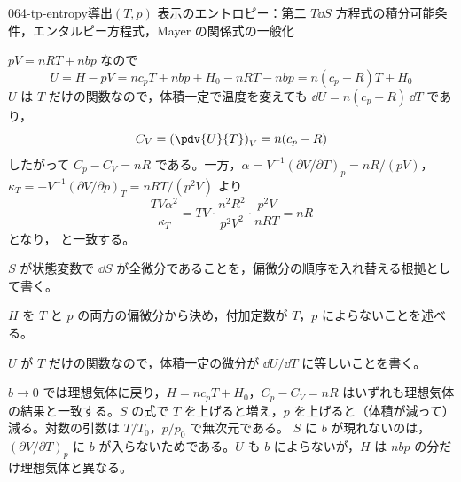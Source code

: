 \documentclass[uplatex,dvipdfmx,a4paper,11pt]{jsarticle}
\begin{document}
\begin{mondai}{064-tp-entropy}{導出}{$(T,p)$ 表示のエントロピー：第二 $T\dd S$ 方程式の積分可能条件，エンタルピー方程式，Mayer の関係式の一般化}
\begin{tadashii}
 $pV = nRT + nbp$ なので
\[ U = H - pV = nc_{p}T + nbp + H_{0} - nRT - nbp = n(c_{p} - R)T + H_{0} \]
$U$ は $T$ だけの関数なので，体積一定で温度を変えても $\dd U = n(c_{p} - R)\,\dd T$ であり，
\[ C_{V} = \left(\pdv{U}{T}\right)_{V} = n(c_{p} - R) \]
したがって $C_{p} - C_{V} = nR$ である。一方，$\alpha = V^{-1}(\partial V/\partial T)_{p} = nR/(pV)$，$\kappa_{T} = -V^{-1}(\partial V/\partial p)_{T} = nRT/(p^{2}V)$ より
\[ \frac{TV\alpha^{2}}{\kappa_{T}} = TV \cdot \frac{n^{2}R^{2}}{p^{2}V^{2}} \cdot \frac{p^{2}V}{nRT} = nR \]
となり， と一致する。
\begin{ronten}
  \item {} $S$ が状態変数で $\dd S$ が全微分であることを，偏微分の順序を入れ替える根拠として書く。
  \item {} $H$ を $T$ と $p$ の両方の偏微分から決め，付加定数が $T$，$p$ によらないことを述べる。
  \item {} $U$ が $T$ だけの関数なので，体積一定の微分が $\dd U/\dd T$ に等しいことを書く。
\end{ronten}
\kenzan $b \to 0$ では理想気体に戻り，$H = nc_{p}T + H_{0}$，$C_{p} - C_{V} = nR$ はいずれも理想気体の結果と一致する。$S$ の式で $T$ を上げると増え，$p$ を上げると（体積が減って）減る。対数の引数は $T/T_{0}$，$p/p_{0}$ で無次元である。
\tsumazuki $S$ に $b$ が現れないのは，$(\partial V/\partial T)_{p}$ に $b$ が入らないためである。$U$ も $b$ によらないが，$H$ は $nbp$ の分だけ理想気体と異なる。
\end{tadashii}
\end{mondai}
\end{document}
